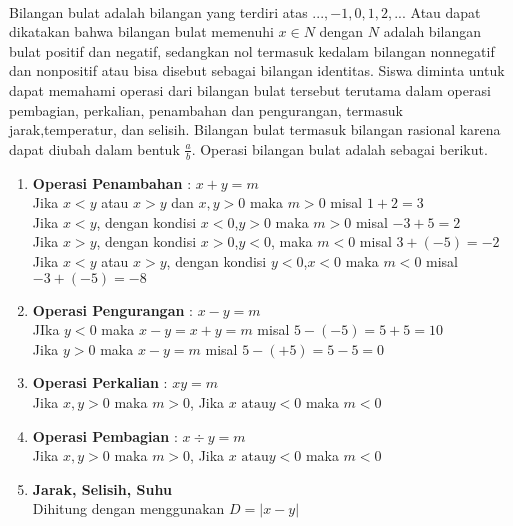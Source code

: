 
	\paragraph*{}
	
	Bilangan bulat adalah bilangan yang terdiri atas $...,-1,0,1,2,..$. Atau dapat dikatakan bahwa bilangan bulat memenuhi $x \in N$ dengan $N$ adalah bilangan bulat positif dan negatif, sedangkan nol termasuk kedalam bilangan nonnegatif dan nonpositif atau bisa disebut sebagai bilangan identitas. Siswa diminta untuk dapat memahami operasi dari bilangan bulat tersebut terutama dalam operasi pembagian, perkalian, penambahan dan pengurangan, termasuk jarak,temperatur, dan selisih.  Bilangan bulat termasuk bilangan rasional karena dapat diubah dalam bentuk $\frac{a}{b}$. Operasi bilangan bulat adalah sebagai berikut.
	\begin{enumerate}
		\item \textbf{Operasi Penambahan} 	: $x+y=m$\\
		Jika $x<y$ atau $x>y$ dan $x,y>0$ maka $m>0$ misal $1+2=3$\\
		Jika $x<y$, dengan kondisi $x<0$,$y>0$  maka $m>0$ misal $-3+5=2$\\
		Jika $x>y$, dengan kondisi $x>0$,$y<0$, maka $m<0$ misal $3+(-5)=-2$\\
		Jika $x<y$ atau $x>y$, dengan kondisi $y<0$,$x<0$  maka $m<0$ misal $-3+(-5)=-8$
		\item \textbf{Operasi Pengurangan} 	: $x-y=m$\\
		JIka $y<0$ maka $x-y=x+y=m$ misal $5-(-5)=5+5=10$\\
		Jika $y>0$ maka $x-y=m$ misal $5-(+5)=5-5=0$
		\item \textbf{Operasi Perkalian}	 	: $xy=m$\\
		Jika $x,y>0$ maka $m>0$, Jika $x \text{ atau} y < 0$ maka $m<0$		
		\item \textbf{Operasi Pembagian}   	: $x\div y=m$\\
		Jika $x,y>0$ maka $m>0$, Jika $x \text{ atau} y < 0$ maka $m<0$
		\item \textbf{Jarak, Selisih, Suhu }\\
		Dihitung dengan menggunakan $D=|x-y|$\\
		
	\end{enumerate}
\newpage
